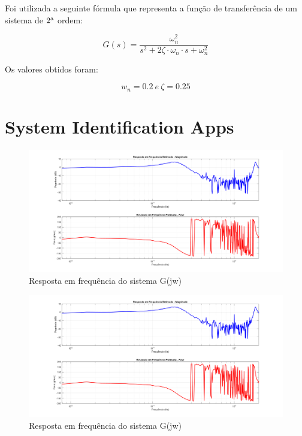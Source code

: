 \documentclass[10pt]{article}
\begin{document}
\quad Foi utilizada a seguinte fórmula que representa a função de transferência de um sistema de $2\textsuperscript{a}$ ordem:

\begin{equation}
    G(s) = \frac{\omega_n^2}{s^2 + 2 \zeta \cdot \omega_n \cdot s + \omega_n^2}
\end{equation}

\quad Os valores obtidos foram:

\begin{equation}
    w_n = 0.2 \ e \ \zeta = 0.25
\end{equation}

\newpage

\section{System Identification Apps}

\begin{figure}[h]
    \centering
    \includegraphics[scale=0.2]{g.png}
    \caption{Resposta em frequência do sistema G(jw)}
\end{figure}

\begin{figure}[h]
    \centering
    \includegraphics[scale=0.2]{g.png}
    \caption{Resposta em frequência do sistema G(jw)}
\end{figure}
\end{document}
